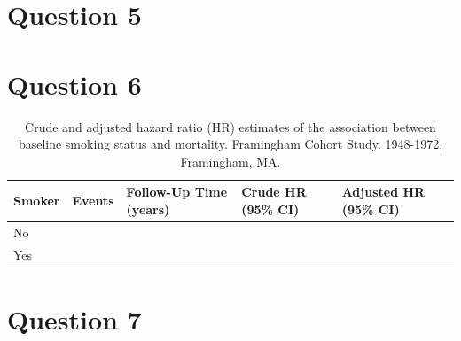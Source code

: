 \documentclass{article}\usepackage[]{graphicx}\usepackage[]{color}
\newif\ifdraft  %
\begin{document}
\fi

\pagebreak

\section*{Question 5}

\ifdraft

Write the equation for the log-hazard function for the \textit{adjusted} model you estimated. \textbf{Clearly define all functions, terms (covariates), and parameters in the model. (20 points)}

\fi

\pagebreak

\section*{Question 6}

\ifdraft

Complete the following table. How would you interpret the parameter estimate that compares smokers to non-smokers in the \textbf{adjusted model}? What measure of association common in epidemiologic research does this correspond to? \textbf{(10 points)}

\fi





\begin{table}[H]
\centering
\parbox{10cm}{\caption{Crude and adjusted hazard ratio (HR) estimates of the association between baseline smoking status and mortality. Framingham Cohort Study. 1948-1972, Framingham, MA.}} 
\begin{tabular}{lllll}
  \hline
Smoker & Events & Follow-Up Time (years) & Crude HR (95\% CI) & Adjusted HR (95\% CI) \\ 
  \hline
No &  &  &  &  \\ 
  Yes &  &  &  &  \\ 
   \hline
\end{tabular}
\end{table}

  
\pagebreak

\section*{Question 7}

\ifdraft

Based on the model that included covariate-by-time interactions, is there evidence for a violation of the proportional hazards assumption in any of the variables? Indicate how you arrived at your conclusion. \ul{In 1-2 sentences} describe in general how you would account for any violations in the proportional hazards assumption (ignoring whether or not there were significant differences here). \textbf{(10 points)}

\fi
\end{document}
